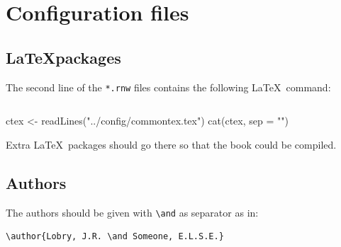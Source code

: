 \documentclass{article}
\begin{document}
\begin{figure}
\centering
{}
\end{figure}

\section{Configuration files}

\subsection{\LaTeX packages}

The second line of the \texttt{*.rnw} files contains the following
\LaTeX~command:

\begin{verbatim}

\end{verbatim}

\begin{Schunk}
\begin{Sinput}
 ctex <- readLines("../config/commontex.tex")
 cat(ctex, sep = "\n")
\end{Sinput}
\begin{Soutput}
\usepackage{graphicx} %
\usepackage{float}
\usepackage{url} %
\usepackage{../config/atxy} %
\usepackage{amsfonts} %
\usepackage[usenames]{color} %
\usepackage{pdfcolmk} %
\end{Soutput}
\end{Schunk}

Extra \LaTeX~packages should go there so that the book could
be compiled.

\subsection{Authors}

The authors should be given with \verb!\and! as separator as in:

\begin{verbatim}
\author{Lobry, J.R. \and Someone, E.L.S.E.}
\end{verbatim}
\end{document}
